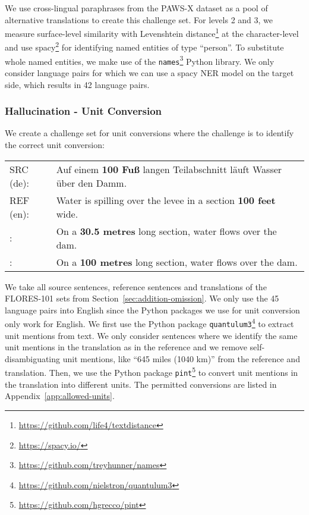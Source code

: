 \documentclass[11pt]{article}
\newcommand{\cmark}{\textcolor{darkpastelgreen}{\ding{51}}}\newcommand{\xmark}{\textcolor{darkpastelred}{\ding{55}}}
\begin{document}
We use cross-lingual paraphrases from the PAWS-X dataset as a pool of alternative translations to create this challenge set. For levels 2 and 3, we measure surface-level similarity with Levenshtein distance\footnote{\url{https://github.com/life4/textdistance}} at the character-level and use spacy\footnote{\url{https://spacy.io/}} \citep{spacy} for identifying named entities of type ``person''. To substitute whole named entities, we make use of the \texttt{names}\footnote{\url{https://github.com/treyhunner/names}} Python library. We only consider language pairs for which we can use a spacy NER model on the target side, which results in 42 language pairs.

\subsubsection{Hallucination - Unit Conversion}
\label{subsec:units}
We create a challenge set for unit conversions where the challenge is to identify the correct unit conversion:

\begin{small}
\vspace{0.5cm}
\setlength{\extrarowheight}{0.1cm}
\begin{tabularx}{0.95\columnwidth}{lX}
     SRC (de): & Auf einem \textbf{100 Fuß} langen Teilabschnitt läuft Wasser über den Damm. \\
     REF (en): & Water is spilling over the levee in a section \textbf{100 feet} wide. \\
     \cmark: & On a \textbf{30.5 metres} long section, water flows over the dam. \\
     \xmark: & On a \textbf{100 metres} long section, water flows over the dam. \vspace{0.35cm}
\end{tabularx}
\end{small}

We take all source sentences, reference sentences and translations of the FLORES-101 sets from Section~\ref{sec:addition-omission}. We only use the 45 language pairs into English since the Python packages we use for unit conversion only work for English. We first use the Python package \texttt{quantulum3}\footnote{\url{https://github.com/nielstron/quantulum3}} to extract unit mentions from text. We only consider sentences where we identify the same unit mentions in the translation as in the reference and we remove self-disambiguating unit mentions, like ``645 miles (1040 km)'' from the reference and translation. Then, we use the Python package \texttt{pint}\footnote{\url{https://github.com/hgrecco/pint}} to convert unit mentions in the translation into different units. The permitted conversions are listed in Appendix~\ref{app:allowed-units}. 
\end{document}
